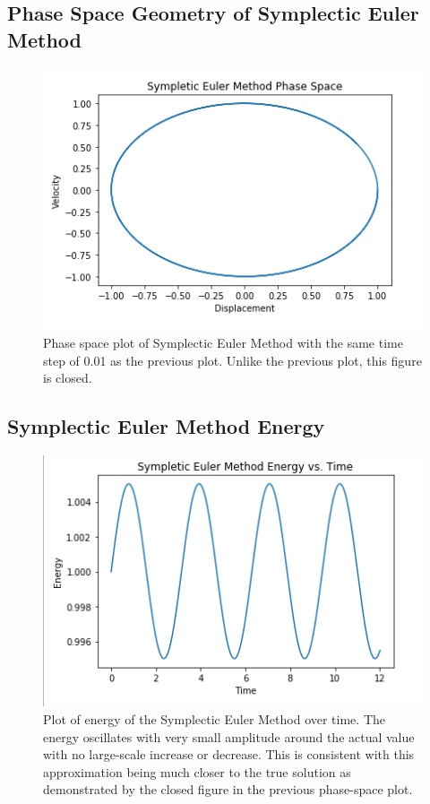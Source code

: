 \documentclass{article}
\begin{document}
\subsection{Phase Space Geometry of Symplectic Euler Method}

\begin{figure}[h!]
\centering
\includegraphics[scale=0.35]{symp_phase.png}
\caption{Phase space plot of Symplectic Euler Method with the same time step of 0.01 as the previous plot. Unlike the previous plot, this figure is closed.}
\label{fig:sympphase}
\end{figure}

\subsection{Symplectic Euler Method Energy}

\begin{figure}[h!]
\centering
\includegraphics[scale=0.35]{symp_energy.png}
\caption{Plot of energy of the Symplectic Euler Method over time. The energy oscillates with very small amplitude around the actual value with no large-scale increase or decrease. This is consistent with this approximation being much closer to the true solution as demonstrated by the closed figure in the previous phase-space plot.}
\label{fig:sympenergy}
\end{figure}
\end{document}
